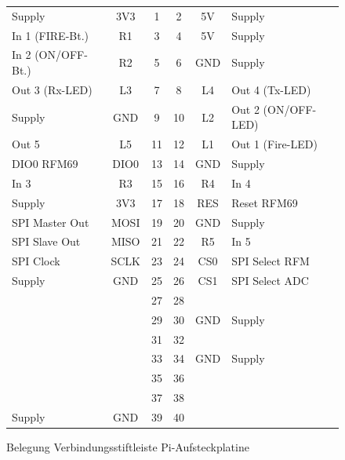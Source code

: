 \documentclass[paper=a4, parskip, numbers=noenddot, toc=listof, headsepline]{scrbook}
\begin{document}
				\begin{figure}
					\centering
					\begin{tabu}
						to \textwidth {Xc|cc|cX}
						Supply            & 3V3  & 1  & 2  & 5V  & Supply             \\
						In 1 (FIRE-Bt.)   & R1   & 3  & 4  & 5V  & Supply             \\
						In 2 (ON/OFF-Bt.) & R2   & 5  & 6  & GND & Supply             \\
						Out 3 (Rx-LED)    & L3   & 7  & 8  & L4  & Out 4 (Tx-LED)     \\
						Supply            & GND  & 9  & 10 & L2  & Out 2 (ON/OFF-LED) \\
						Out 5             & L5   & 11 & 12 & L1  & Out 1 (Fire-LED)   \\
						DIO0 RFM69        & DIO0 & 13 & 14 & GND & Supply             \\
						In 3              & R3   & 15 & 16 & R4  & In 4               \\
						Supply            & 3V3  & 17 & 18 & RES & Reset RFM69        \\
						SPI Master Out    & MOSI & 19 & 20 & GND & Supply             \\
						SPI Slave Out     & MISO & 21 & 22 & R5  & In 5               \\
						SPI Clock         & SCLK & 23 & 24 & CS0 & SPI Select RFM     \\
						Supply            & GND  & 25 & 26 & CS1 & SPI Select ADC     \\
						~                 &      & 27 & 28 &     &                    \\
						~                 &      & 29 & 30 & GND & Supply             \\
						~                 &      & 31 & 32 &     &                    \\
						~                 &      & 33 & 34 & GND & Supply             \\
						~                 &      & 35 & 36 &     &                    \\
						~                 &      & 37 & 38 &     &                    \\
						Supply            & GND  & 39 & 40 &     &                    \\ 
					\end{tabu}
					\caption{Belegung Verbindungsstiftleiste Pi-Aufsteckplatine}
					\label{fig:piheader}
				\end{figure}
\end{document}
